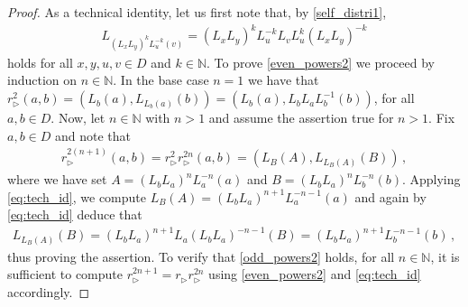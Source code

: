 \documentclass[10pt,a4paper]{amsart}
\newcommand{\tr}{\triangleright}
\begin{document}
\begin{proof}
    As a technical identity, let us first note that, {by \eqref{self_distri1}},
    \begin{align}\label{eq:tech_id}
        L_{\left(L_xL_y\right)^kL_u^{-k}(v)} =
        \left(L_xL_y\right)^kL_u^{-k}L_vL_u^k\left(L_xL_y\right)^{-k}
    \end{align}
    holds for all $x,y,u,v \in D$ and $k \in \mathbb{N}$.
    To prove \eqref{even_powers2} we proceed by induction on $n \in \mathbb{N}$.
    In the base case $n = 1$ we have that 
    $r^2_\tr(a,b) = \left(L_b(a),L_{L_b(a)}(b)\right) = \left(L_b(a),L_bL_aL_b^{-1}(b)\right)$, for all $a,b \in D$.
    Now, let $n \in \mathbb{N}$ with $n > 1$ and assume the assertion true for $n > 1$.
    Fix $a,b \in D$ and note that
    \begin{align*}
        r_\tr^{2(n+1)}(a,b) 
            = 
            r_\tr^2 r_\tr^{2n}(a,b)
            =
            (L_B(A),L_{L_B(A)}(B)) \,,
    \end{align*}
    where we have set $A = (L_bL_a)^{n}L_a^{-n}(a)$ and $B = (L_bL_a)^{n}L_b^{-n}(b)$.
    Applying \eqref{eq:tech_id}, we compute $L_B(A) = \left(L_bL_a\right)^{n+1}L_a^{-n-1}(a)$ and again by \eqref{eq:tech_id} deduce that
    \begin{align*}
        L_{L_B(A)}(B) 
        = \left(L_bL_a\right)^{n+1}L_a\left(L_bL_a\right)^{-n-1}(B) 
        = \left(L_bL_a\right)^{n+1}L_b^{-n-1}(b) \,,
    \end{align*}
    thus proving the assertion.
    To verify that \eqref{odd_powers2} holds, for all $n \in \mathbb{N}$, it is sufficient to compute $r_\tr^{2n+1} = r^{}_\tr r_\tr^{2n}$ using \eqref{even_powers2} and \eqref{eq:tech_id} accordingly.
\end{proof}
\end{document}
